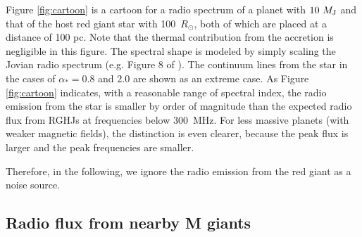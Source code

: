 \documentclass[iop,numberedappendix,apj,twocolappendix,]{emulateapj}
\begin{document}
Figure \ref{fig:cartoon} is a cartoon for a radio spectrum of a planet with $10~M_{\rm J}$ and that of the host red giant star with 100~$R_{\odot }$, both of which are placed at a distance of 100 pc. 
Note that the thermal contribution from the accretion is negligible in this figure. 
The spectral shape is modeled by simply scaling the Jovian radio spectrum (e.g. Figure 8 of \cite{zarka_et_al2004}). 
The continuum lines from the star in the cases of $\alpha_* =0.8$ and $2.0$ are shown as an extreme case.  
As Figure \ref{fig:cartoon} indicates, with a reasonable range of spectral index, the radio emission from the star is smaller by order of magnitude than the expected radio flux from RGHJs at frequencies below 300~MHz. 
For less massive planets (with weaker magnetic fields), the distinction is even clearer, because the peak flux is larger and the peak frequencies are smaller. 


Therefore, in the following, we ignore the radio emission from the red giant as a noise source. 



\subsection{Radio flux from nearby M giants}
\label{ss:actualMgiants}
\end{document}
